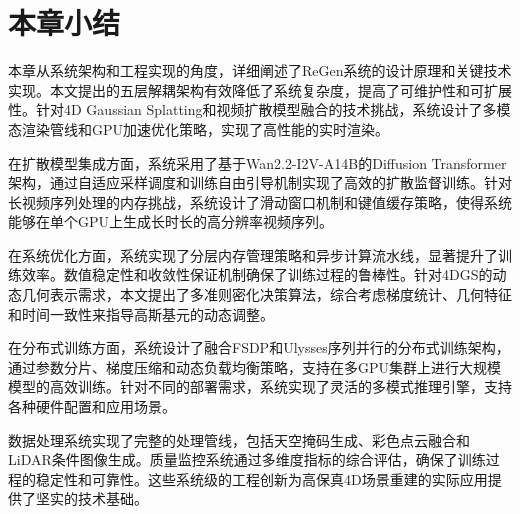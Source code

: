 \section{本章小结}

本章从系统架构和工程实现的角度，详细阐述了ReGen系统的设计原理和关键技术实现。本文提出的五层解耦架构有效降低了系统复杂度，提高了可维护性和可扩展性。针对4D Gaussian Splatting和视频扩散模型融合的技术挑战，系统设计了多模态渲染管线和GPU加速优化策略，实现了高性能的实时渲染。

在扩散模型集成方面，系统采用了基于Wan2.2-I2V-A14B的Diffusion Transformer架构，通过自适应采样调度和训练自由引导机制实现了高效的扩散监督训练。针对长视频序列处理的内存挑战，系统设计了滑动窗口机制和键值缓存策略，使得系统能够在单个GPU上生成长时长的高分辨率视频序列。

在系统优化方面，系统实现了分层内存管理策略和异步计算流水线，显著提升了训练效率。数值稳定性和收敛性保证机制确保了训练过程的鲁棒性。针对4DGS的动态几何表示需求，本文提出了多准则密化决策算法，综合考虑梯度统计、几何特征和时间一致性来指导高斯基元的动态调整。

在分布式训练方面，系统设计了融合FSDP和Ulysses序列并行的分布式训练架构，通过参数分片、梯度压缩和动态负载均衡策略，支持在多GPU集群上进行大规模模型的高效训练。针对不同的部署需求，系统实现了灵活的多模式推理引擎，支持各种硬件配置和应用场景。

数据处理系统实现了完整的处理管线，包括天空掩码生成、彩色点云融合和LiDAR条件图像生成。质量监控系统通过多维度指标的综合评估，确保了训练过程的稳定性和可靠性。这些系统级的工程创新为高保真4D场景重建的实际应用提供了坚实的技术基础。
